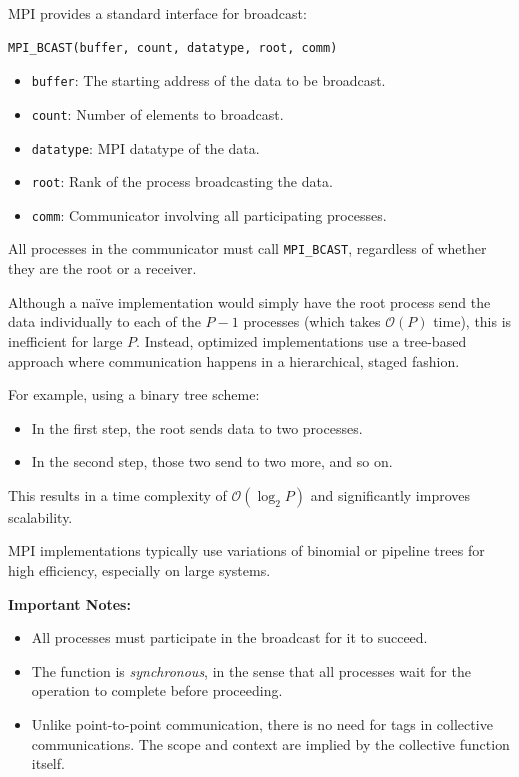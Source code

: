 \documentclass[12pt]{book}
\begin{document}
MPI provides a standard interface for broadcast:

\begin{lstlisting}
MPI_BCAST(buffer, count, datatype, root, comm)    
\end{lstlisting}

\begin{itemize}
    \item \texttt{buffer}: The starting address of the data to be broadcast.
    \item \texttt{count}: Number of elements to broadcast.
    \item \texttt{datatype}: MPI datatype of the data.
    \item \texttt{root}: Rank of the process broadcasting the data.
    \item \texttt{comm}: Communicator involving all participating processes.
\end{itemize}

All processes in the communicator must call \texttt{MPI\_BCAST}, regardless of whether they are the root or a receiver.

\vspace{1em}
Although a naïve implementation would simply have the root process send the data individually to each of the $P - 1$ processes (which takes $\mathcal{O}(P)$ time), this is inefficient for large $P$. Instead, optimized implementations use a tree-based approach where communication happens in a hierarchical, staged fashion.

For example, using a binary tree scheme:
\begin{itemize}
    \item In the first step, the root sends data to two processes.
    \item In the second step, those two send to two more, and so on.
\end{itemize}
This results in a time complexity of $\mathcal{O}(\log_2 P)$ and significantly improves scalability.

MPI implementations typically use variations of binomial or pipeline trees for high efficiency, especially on large systems.

\vspace{1em}
\textbf{Important Notes:}
\begin{itemize}
    \item All processes must participate in the broadcast for it to succeed.
    \item The function is \emph{synchronous}, in the sense that all processes wait for the operation to complete before proceeding.
    \item Unlike point-to-point communication, there is no need for tags in collective communications. The scope and context are implied by the collective function itself.
\end{itemize}
\end{document}
